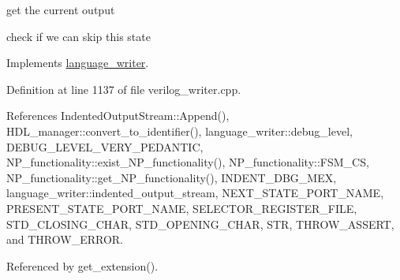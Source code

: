 get the current output

check if we can skip this state 

Implements \hyperlink{classlanguage__writer_a1eb41e600406aea66d35f6da5ef16098}{language\+\_\+writer}.



Definition at line 1137 of file verilog\+\_\+writer.\+cpp.



References Indented\+Output\+Stream\+::\+Append(), H\+D\+L\+\_\+manager\+::convert\+\_\+to\+\_\+identifier(), language\+\_\+writer\+::debug\+\_\+level, D\+E\+B\+U\+G\+\_\+\+L\+E\+V\+E\+L\+\_\+\+V\+E\+R\+Y\+\_\+\+P\+E\+D\+A\+N\+T\+IC, N\+P\+\_\+functionality\+::exist\+\_\+\+N\+P\+\_\+functionality(), N\+P\+\_\+functionality\+::\+F\+S\+M\+\_\+\+CS, N\+P\+\_\+functionality\+::get\+\_\+\+N\+P\+\_\+functionality(), I\+N\+D\+E\+N\+T\+\_\+\+D\+B\+G\+\_\+\+M\+EX, language\+\_\+writer\+::indented\+\_\+output\+\_\+stream, N\+E\+X\+T\+\_\+\+S\+T\+A\+T\+E\+\_\+\+P\+O\+R\+T\+\_\+\+N\+A\+ME, P\+R\+E\+S\+E\+N\+T\+\_\+\+S\+T\+A\+T\+E\+\_\+\+P\+O\+R\+T\+\_\+\+N\+A\+ME, S\+E\+L\+E\+C\+T\+O\+R\+\_\+\+R\+E\+G\+I\+S\+T\+E\+R\+\_\+\+F\+I\+LE, S\+T\+D\+\_\+\+C\+L\+O\+S\+I\+N\+G\+\_\+\+C\+H\+AR, S\+T\+D\+\_\+\+O\+P\+E\+N\+I\+N\+G\+\_\+\+C\+H\+AR, S\+TR, T\+H\+R\+O\+W\+\_\+\+A\+S\+S\+E\+RT, and T\+H\+R\+O\+W\+\_\+\+E\+R\+R\+OR.



Referenced by get\+\_\+extension().

